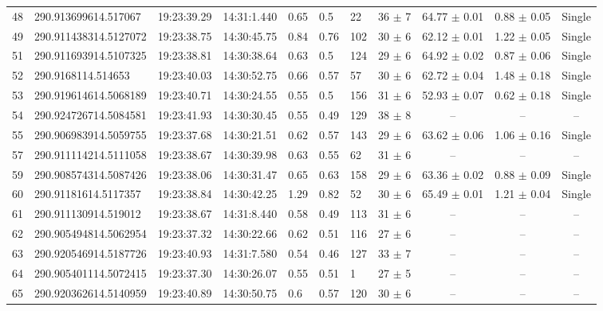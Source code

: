\begin{table}[htbp!]
\begin{tabular}{llllllllccc}
48  &  290.913699614.517067  &  19:23:39.29  &  14:31:1.440  &  0.65  &  0.5  &  22  &  36 $\pm$ 7  &  64.77 $\pm$ 0.01  &  0.88 $\pm$ 0.05  &  Single \\
49  &  290.911438314.5127072  &  19:23:38.75  &  14:30:45.75  &  0.84  &  0.76  &  102  &  30 $\pm$ 6  &  62.12 $\pm$ 0.01  &  1.22 $\pm$ 0.05  &  Single \\
51  &  290.911693914.5107325  &  19:23:38.81  &  14:30:38.64  &  0.63  &  0.5  &  124  &  29 $\pm$ 6  &  64.92 $\pm$ 0.02  &  0.87 $\pm$ 0.06  &  Single \\
52  &  290.9168114.514653  &  19:23:40.03  &  14:30:52.75  &  0.66  &  0.57  &  57  &  30 $\pm$ 6  &  62.72 $\pm$ 0.04  &  1.48 $\pm$ 0.18  &  Single \\
53  &  290.919614614.5068189  &  19:23:40.71  &  14:30:24.55  &  0.55  &  0.5  &  156  &  31 $\pm$ 6  &  52.93 $\pm$ 0.07  &  0.62 $\pm$ 0.18  &  Single \\
54  &  290.924726714.5084581  &  19:23:41.93  &  14:30:30.45  &  0.55  &  0.49  &  129  &  38 $\pm$ 8  &  --  &  --  &  -- \\
55  &  290.906983914.5059755  &  19:23:37.68  &  14:30:21.51  &  0.62  &  0.57  &  143  &  29 $\pm$ 6  &  63.62 $\pm$ 0.06  &  1.06 $\pm$ 0.16  &  Single \\
57  &  290.911114214.5111058  &  19:23:38.67  &  14:30:39.98  &  0.63  &  0.55  &  62  &  31 $\pm$ 6  &  --  &  --  &  -- \\
59  &  290.908574314.5087426  &  19:23:38.06  &  14:30:31.47  &  0.65  &  0.63  &  158  &  29 $\pm$ 6  &  63.36 $\pm$ 0.02  &  0.88 $\pm$ 0.09  &  Single \\
60  &  290.91181614.5117357  &  19:23:38.84  &  14:30:42.25  &  1.29  &  0.82  &  52  &  30 $\pm$ 6  &  65.49 $\pm$ 0.01  &  1.21 $\pm$ 0.04  &  Single \\
61  &  290.911130914.519012  &  19:23:38.67  &  14:31:8.440  &  0.58  &  0.49  &  113  &  31 $\pm$ 6  &  --  &  --  &  -- \\
62  &  290.905494814.5062954  &  19:23:37.32  &  14:30:22.66  &  0.62  &  0.51  &  116  &  27 $\pm$ 6  &  --  &  --  &  -- \\
63  &  290.920546914.5187726  &  19:23:40.93  &  14:31:7.580  &  0.54  &  0.46  &  127  &  33 $\pm$ 7  &  --  &  --  &  -- \\
64  &  290.905401114.5072415  &  19:23:37.30  &  14:30:26.07  &  0.55  &  0.51  &  1  &  27 $\pm$ 5  &  --  &  --  &  -- \\
65  &  290.920362614.5140959  &  19:23:40.89  &  14:30:50.75  &  0.6  &  0.57  &  120  &  30 $\pm$ 6  &  --  &  --  &  -- \\

\end{tabular}
\end{table}
